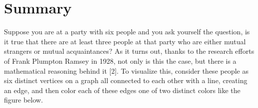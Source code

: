 \documentclass[ fontsize=10pt,twoside]{scrartcl}	%
\begin{document}
\section{Summary}
\doublespacing 
Suppose you are at a party with six people and you ask yourself the question, is it true that there are at least three people at that party who are either mutual strangers or mutual acquaintances? As it turns out, thanks to the research efforts of Frank Plumpton Ramsey in 1928, not only is this the case, but there is a mathematical reasoning behind it [2]. To visualize this, consider these people as six distinct vertices on a graph all connected to each other with a line, creating an edge, and then color each of these edges one of two distinct colors like the figure below.
\begin{center}

%
\end{center}
\end{document}
